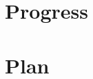 \documentclass{article}
\begin{document}
\usepackage{amsmath}
\usepackage{amssymb}
\usepackage{algorithm}
\usepackage{algorithmic}
\usepackage{graphicx}
\graphicspath{{./}{./Figures/}}


\usepackage{hyperref} 

\section{Progress}
\label{sec:progress}

\section{Plan}
\label{sec:plan}

\end{document}
